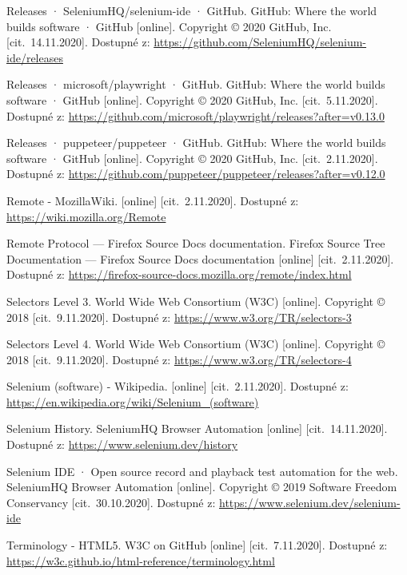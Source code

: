 \begin{thebibliography}{99}
 Releases · SeleniumHQ/selenium-ide · GitHub. GitHub: Where the world builds software · GitHub [online]. Copyright © 2020 GitHub, Inc. [cit.~14.11.2020]. Dostupné z: \url{https://github.com/SeleniumHQ/selenium-ide/releases}

 Releases · microsoft/playwright · GitHub. GitHub: Where the world builds software · GitHub [online]. Copyright © 2020 GitHub, Inc. [cit.~5.11.2020]. Dostupné z: \url{https://github.com/microsoft/playwright/releases?after=v0.13.0}

 Releases · puppeteer/puppeteer · GitHub. GitHub: Where the world builds software · GitHub [online]. Copyright © 2020 GitHub, Inc. [cit.~2.11.2020]. Dostupné z: \url{https://github.com/puppeteer/puppeteer/releases?after=v0.12.0}

 Remote - MozillaWiki. [online] [cit.~2.11.2020]. Dostupné z: \url{https://wiki.mozilla.org/Remote}

 Remote Protocol — Firefox Source Docs documentation. Firefox Source Tree Documentation — Firefox Source Docs documentation [online] [cit.~2.11.2020]. Dostupné z: \url{https://firefox-source-docs.mozilla.org/remote/index.html}

 Selectors Level 3. World Wide Web Consortium (W3C) [online]. Copyright © 2018 [cit.~9.11.2020]. Dostupné z: \url{https://www.w3.org/TR/selectors-3}

 Selectors Level 4. World Wide Web Consortium (W3C) [online]. Copyright © 2018 [cit.~9.11.2020]. Dostupné z: \url{https://www.w3.org/TR/selectors-4}

 Selenium (software) - Wikipedia. [online] [cit.~2.11.2020]. Dostupné z: \url{https://en.wikipedia.org/wiki/Selenium_(software)}

 Selenium History. SeleniumHQ Browser Automation [online] [cit.~14.11.2020]. Dostupné z: \url{https://www.selenium.dev/history}

 Selenium IDE · Open source record and playback test automation for the web. SeleniumHQ Browser Automation [online]. Copyright © 2019 Software Freedom Conservancy [cit.~30.10.2020]. Dostupné z: \url{https://www.selenium.dev/selenium-ide}

 Terminology - HTML5. W3C on GitHub [online] [cit.~7.11.2020]. Dostupné z: \url{https://w3c.github.io/html-reference/terminology.html}


\end{thebibliography}
